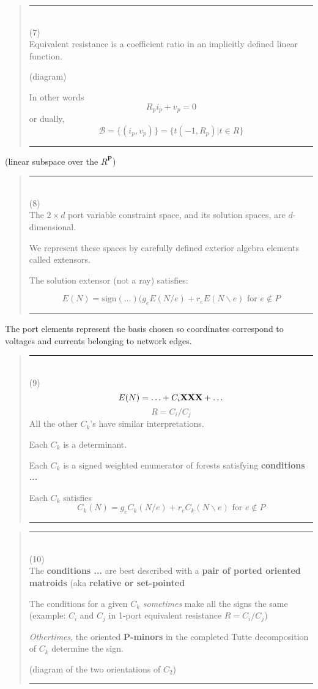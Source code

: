 \documentclass{article}
\begin{document}
\pagebreak[3] \begin{quote}\rule{\textwidth}{3pt}\\
(7)\\
Equivalent resistance is a coefficient ratio in an 
implicitly defined linear function.

(diagram)

In other words
\[
R_pi_p + v_p = 0
\]
or dually,
\[
\mathcal{B} = \{(i_p,v_p)\}
= \{ t(-1, R_p) | t\in R\}
\]

\rule{\textwidth}{3pt}
\end{quote}

(linear subspace over the $R^{\mathbf{P}}$)

\pagebreak[3] \begin{quote}\rule{\textwidth}{3pt}\\
(8)\\
The $2\times d$ port variable constraint space, 
and its solution spaces, are $d$-dimensional.

We represent these spaces by carefully defined
exterior algebra elements called extensors.

The solution extensor (not a ray) satisfies:

\[
E(N) = \text{sign}(...)(g_e E(N/e) + r_e E(N\backslash e)
\text{\ for\ }e\not\in P
\]

\rule{\textwidth}{3pt}
\end{quote}

The port elements represent the basis chosen so coordinates correspond
to voltages and currents belonging to network edges. 

\pagebreak[3] \begin{quote}\rule{\textwidth}{3pt}\\
(9)\\
\[
E(N) = \ldots + C_i\mbox{\bf XXX} + \ldots
\]
\[
R = C_i/C_j
\]
All the other $C_k$'s have similar interpretations.

Each $C_k$ is a determinant.

Each $C_k$ is a signed weighted enumerator of
forests satisfying \textbf{conditions ...}

Each $C_k$ satisfies
\[
C_k(N) = g_e C_k(N/e) + r_e C_k(N\backslash e)
\text{\ for\ }e\not\in {P}
\]

\rule{\textwidth}{3pt}
\end{quote}


\pagebreak[3] \begin{quote}\rule{\textwidth}{3pt}\\
(10)\\
The \textbf{conditions ...} are best described with 
a \textbf{pair of ported oriented matroids}
(aka \textbf{relative or set-pointed}

The conditions for a given $C_k$ \textit{sometimes}
make all the signs the same (example: $C_i$ and 
$C_j$ in 1-port equivalent resistance $R=C_i/C_j$)

\textit{Othertimes}, the oriented \textbf{P-minors}
in the completed Tutte decomposition of $C_k$ determine
the sign.

(diagram of the two orientations of $C_2$)

\rule{\textwidth}{3pt}
\end{quote}
\end{document}
